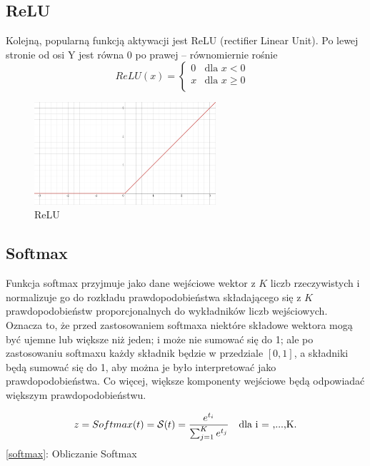 \documentclass{article}
\begin{document}
\subsection{ReLU}
Kolejną, popularną funkcją aktywacji jest ReLU (rectifier Linear Unit). Po lewej stronie od osi Y jest równa 0 po prawej -- równomiernie rośnie
\begin{equation}
	ReLU(x) = 
	\begin{cases}
		0 & \text{dla $x < 0$}\\
		x & \text{dla $x \geqslant 0$ }\\
	\end{cases}    
\end{equation}

\begin{figure}[H]
	\centering
	\includegraphics[width=0.6\textwidth,keepaspectratio=true]{ReLu}
	\caption{
		ReLU
	}
\end{figure}

\subsection{Softmax}
Funkcja softmax przyjmuje jako dane wejściowe wektor z $K$ liczb rzeczywistych i normalizuje go do rozkładu prawdopodobieństwa składającego się z $K$ prawdopodobieństw proporcjonalnych do wykładników liczb wejściowych. Oznacza to, że przed zastosowaniem softmaxa niektóre składowe wektora mogą być ujemne lub większe niż jeden; i może nie sumować się do 1; ale po zastosowaniu softmaxu każdy składnik będzie w przedziale $[0,1]$, a składniki będą sumować się do 1, aby można je było interpretować jako prawdopodobieństwa. Co więcej, większe komponenty wejściowe będą odpowiadać większym prawdopodobieństwu.

\begin{center}
	\begin{equation}	
		z = Softmax(t) = \mathcal{S}(t) = \dfrac{e^{t_i}}{\sum_{j=1}^{K}e^{t_j}}\text{\quad dla i = ,...,K.}
		\label{softmax}
	\end{equation}
	\ref{softmax}: Obliczanie Softmax
\end{center} 
\end{document}
